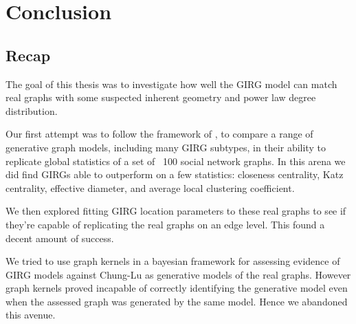 \chapter{Conclusion}
\minitoc
\section{Recap}
The goal of this thesis was to investigate how well the GIRG model can match real graphs with some suspected inherent geometry and power law degree distribution.

Our first attempt was to follow the framework of \cite{blasius2018towards}, to compare a range of generative graph models, including many GIRG subtypes, in their ability to replicate global statistics of a set of ~100 social network graphs.
In this arena we did find GIRGs able to outperform on a few statistics: closeness centrality, Katz centrality, effective diameter, and average local clustering coefficient. 

We then explored fitting GIRG location parameters to these real graphs to see if they're capable of replicating the real graphs on an edge level. This found a decent amount of success.

We tried to use graph kernels in a bayesian framework for assessing evidence of GIRG models against Chung-Lu as generative models of the real graphs. However graph kernels proved incapable of correctly identifying the generative model even when the assessed graph was generated by the same model. Hence we abandoned this avenue.











